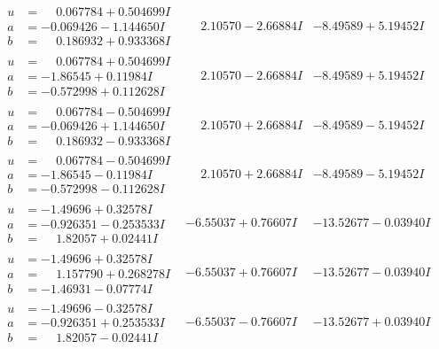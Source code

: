 \documentclass[1p]{elsarticle_modified}
\theoremstyle{definition}
\begin{document}
$$\begin{array}{c|c|c}
\begin{aligned}
u &= \phantom{-}0.067784 + 0.504699 I \\
a &= -0.069426 - 1.144650 I \\
b &= \phantom{-}0.186932 + 0.933368 I\end{aligned}
 & \phantom{-}2.10570 - 2.66884 I & -8.49589 + 5.19452 I \\ \hline\begin{aligned}
u &= \phantom{-}0.067784 + 0.504699 I \\
a &= -1.86545 + 0.11984 I \\
b &= -0.572998 + 0.112628 I\end{aligned}
 & \phantom{-}2.10570 - 2.66884 I & -8.49589 + 5.19452 I \\ \hline\begin{aligned}
u &= \phantom{-}0.067784 - 0.504699 I \\
a &= -0.069426 + 1.144650 I \\
b &= \phantom{-}0.186932 - 0.933368 I\end{aligned}
 & \phantom{-}2.10570 + 2.66884 I & -8.49589 - 5.19452 I \\ \hline\begin{aligned}
u &= \phantom{-}0.067784 - 0.504699 I \\
a &= -1.86545 - 0.11984 I \\
b &= -0.572998 - 0.112628 I\end{aligned}
 & \phantom{-}2.10570 + 2.66884 I & -8.49589 - 5.19452 I \\ \hline\begin{aligned}
u &= -1.49696 + 0.32578 I \\
a &= -0.926351 - 0.253533 I \\
b &= \phantom{-}1.82057 + 0.02441 I\end{aligned}
 & -6.55037 + 0.76607 I & -13.52677 - 0.03940 I \\ \hline\begin{aligned}
u &= -1.49696 + 0.32578 I \\
a &= \phantom{-}1.157790 + 0.268278 I \\
b &= -1.46931 - 0.07774 I\end{aligned}
 & -6.55037 + 0.76607 I & -13.52677 - 0.03940 I \\ \hline\begin{aligned}
u &= -1.49696 - 0.32578 I \\
a &= -0.926351 + 0.253533 I \\
b &= \phantom{-}1.82057 - 0.02441 I\end{aligned}
 & -6.55037 - 0.76607 I & -13.52677 + 0.03940 I \\ \hline\begin{aligned}

\end{aligned}
\end{array}$$
\end{document}

